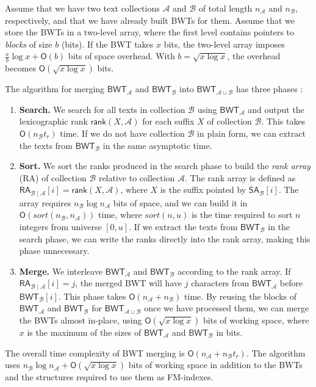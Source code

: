 \documentclass[smallabstract,smallcaptions]{dccpaper}
\newcommand{\Oh}{\ensuremath{\mathsf{O}}}
\newcommand{\BWT}{\textsf{BWT}}
\newcommand{\RA}{\textsf{RA}}
\newcommand{\mSA}{\ensuremath{\mathsf{SA}}}
\newcommand{\mBWT}{\ensuremath{\mathsf{BWT}}}
\newcommand{\mRA}{\ensuremath{\mathsf{RA}}}
\newcommand{\mrank}{\ensuremath{\mathsf{rank}}}
\newcommand{\Acoll}{\ensuremath{\mathcal{A}}}
\newcommand{\Bcoll}{\ensuremath{\mathcal{B}}}
\begin{document}
\Section{Merging \BWT{}s of text collections}

Assume that we have two text collections $\Acoll$ and $\Bcoll$ of total length $n_{\Acoll}$ and $n_{\Bcoll}$, respectively, and that we have already built \BWT{}s for them. Assume that we store the \BWT{}s in a two-level array, where the first level contains pointers to \emph{blocks} of size $b$ (bits). If the \BWT{} takes $x$ bits, the two-level array imposes $\frac{x}{b} \log x + \Oh(b)$ bits of space overhead. With $b = \sqrt{x \log x}$, the overhead becomes $\Oh(\sqrt{x \log x})$ bits.

The algorithm for merging $\mBWT_{\Acoll}$ and $\mBWT_{\Bcoll}$ into $\mBWT_{\Acoll \cup \Bcoll}$ has three phases \cite{Siren2009}:
\begin{enumerate}

\item \textbf{Search.} We search for all texts in collection $\Bcoll$ using $\mBWT_{\Acoll}$ and output the lexicographic rank $\mrank(X, \Acoll)$ for each suffix $X$ of collection $\Bcoll$. This takes $\Oh(n_{\Bcoll} t_{r})$ time. If we do not have collection $\Bcoll$ in plain form, we can extract the texts from $\mBWT_{\Bcoll}$ in the same asymptotic time.

\item \textbf{Sort.} We sort the ranks produced in the search phase to build the \emph{rank array} (\RA) of collection $\Bcoll$ relative to collection $\Acoll$. The rank array is defined as $\mRA_{\Bcoll \mid \Acoll}[i] = \mrank(X, \Acoll)$, where $X$ is the suffix pointed by $\mSA_{\Bcoll}[i]$. The array requires $n_{\Bcoll} \log n_{\Acoll}$ bits of space, and we can build it in $\Oh(sort(n_{\Bcoll}, n_{\Acoll}))$ time, where $sort(n, u)$ is the time required to sort $n$ integers from universe $[0,u]$. If we extract the texts from $\mBWT_{\Bcoll}$ in the search phase, we can write the ranks directly into the rank array, making this phase unnecessary.

\item \textbf{Merge.} We interleave $\mBWT_{\Acoll}$ and $\mBWT_{\Bcoll}$ according to the rank array. If $\mRA_{\Bcoll \mid \Acoll}[i] = j$, the merged \BWT{} will have $j$ characters from $\mBWT_{\Acoll}$ before $\mBWT_{\Bcoll}[i]$. This phase takes $\Oh(n_{\Acoll} + n_{\Bcoll})$ time. By reusing the blocks of $\mBWT_{\Acoll}$ and $\mBWT_{\Bcoll}$ for $\mBWT_{\Acoll \cup \Bcoll}$ once we have processed them, we can merge the \BWT{}s almost in-place, using $\Oh(\sqrt{x \log x})$ bits of working space, where $x$ is the maximum of the sizes of $\mBWT_{\Acoll}$ and $\mBWT_{\Bcoll}$ in bits.

\end{enumerate}
The overall time complexity of \BWT{} merging is $\Oh(n_{\Acoll} + n_{\Bcoll} t_{r})$. The algorithm uses $n_{\Bcoll} \log n_{\Acoll} + \Oh(\sqrt{x \log x})$ bits of working space in addition to the \BWT{}s and the structures required to use them as FM-indexes.
\end{document}
